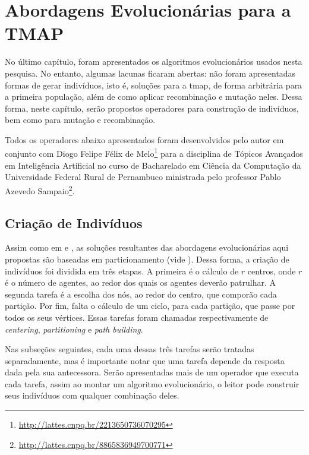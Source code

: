 \chapter{Abordagens Evolucionárias para a TMAP}
\label{chp:abordagens}

No último capítulo, foram apresentados os algoritmos evolucionários usados nesta 
pesquisa. No entanto, algumas lacunas ficaram abertas: não foram apresentadas 
formas de gerar indivíduos, isto é, soluções para a \ac{tmap}, de forma 
arbitrária para a primeira população, além de como aplicar 
recombinação e mutação neles. Dessa forma, neste capítulo, serão propostos 
operadores para construção de indivíduos, bem como para mutação e recombinação.

Todos os operadores abaixo apresentados foram desenvolvidos pelo autor em 
conjunto com Diogo Felipe Félix de 
Melo\footnote{\url{http://lattes.cnpq.br/2213650736070295}} para a disciplina 
de Tópicos Avançados em Inteligência Artificial no curso de Bacharelado em 
Ciência da Computação da Universidade Federal Rural de Pernambuco ministrada 
pelo professor Pablo Azevedo 
Sampaio\footnote{\url{http://lattes.cnpq.br/8865836949700771}}.

\section{Criação de Indivíduos}

Assim como em \citep{Pippin:2013:PBT:2480362.2480378} e \citep{4630897}, as 
soluções resultantes das abordagens evolucionárias aqui propostas são baseadas 
em particionamento (vide ). Dessa forma, a criação de 
indivíduos foi dividida em três etapas. A primeira é o cálculo de $r$ centros, 
onde $r$ é o número de agentes, ao redor dos quais os agentes deverão patrulhar. 
A segunda tarefa é a escolha dos nós, ao redor do centro, que comporão cada 
partição. Por fim, falta o cálculo de um ciclo, para cada partição, que passe 
por todos os seus vértices. Essas tarefas foram chamadas respectivamente de 
\textit{centering}, \textit{partitioning} e \textit{path building}.

Nas subseções seguintes, cada uma dessas três tarefas serão tratadas 
separadamente, mas é importante notar que uma tarefa depende da resposta dada 
pela sua antecessora. Serão apresentadas mais de um operador que executa cada 
tarefa, assim ao montar um algoritmo evolucionário, o leitor pode construir 
seus indivíduos com qualquer combinação deles.

